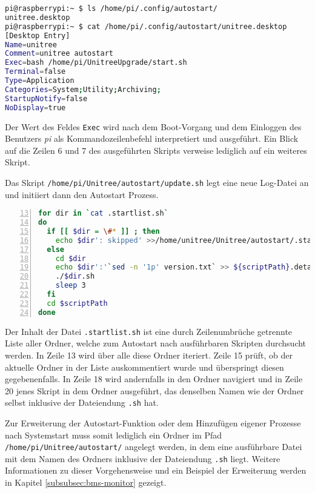 \begin{lstlisting}[language=sh]
pi@raspberrypi:~ $ ls /home/pi/.config/autostart/
unitree.desktop
pi@raspberrypi:~ $ cat /home/pi/.config/autostart/unitree.desktop
[Desktop Entry]
Name=unitree
Comment=unitree autostart
Exec=bash /home/pi/UnitreeUpgrade/start.sh
Terminal=false
Type=Application
Categories=System;Utility;Archiving;
StartupNotify=false
NoDisplay=true
\end{lstlisting}

\noindent Der Wert des Feldes \texttt{Exec} wird nach dem Boot-Vorgang und dem Einloggen des Benutzers \emph{pi} als
Kommandozeilenbefehl interpretiert und ausgeführt.
Ein Blick auf die Zeilen \num{6} und \num{7} des ausgeführten Skripts verweise lediglich auf ein weiteres Skript.



\noindent Das Skript \texttt{/home/\allowbreak pi/\allowbreak Unitree/\allowbreak autostart/\allowbreak update.sh}
legt eine neue Log-Datei an und initiiert dann den Autostart Prozess.

\begin{lstlisting}[language=Bash,numbers=left,xleftmargin=2.5em,framexleftmargin=2em,firstnumber=13]
for dir in `cat .startlist.sh`
do
  if [[ $dir = \#* ]] ; then
    echo $dir': skipped' >>/home/unitree/Unitree/autostart/.startlog
  else
    cd $dir
    echo $dir':'`sed -n '1p' version.txt` >> ${scriptPath}.detailedVersion
    ./$dir.sh
    sleep 3
  fi
  cd $scriptPath
done
\end{lstlisting}

\noindent Der Inhalt der Datei \texttt{.startlist.sh} ist eine durch Zeilenumbrüche getrennte Liste aller Ordner, welche
zum Autostart nach ausführbaren Skripten durchsucht werden.
In Zeile \num{13} wird über alle diese Ordner iteriert.
Zeile \num{15} prüft, ob der aktuelle Ordner in der Liste auskommentiert wurde und überspringt diesen gegebenenfalls.
In Zeile \num{18} wird andernfalls in den Ordner navigiert und in Zeile \num{20} jenes Skript in dem Ordner ausgeführt,
das denselben Namen wie der Ordner selbst inklusive der Dateiendung \texttt{.sh} hat.

Zur Erweiterung der Autostart-Funktion oder dem Hinzufügen eigener Prozesse nach Systemstart muss somit lediglich ein
Ordner im Pfad \texttt{/home/\allowbreak pi/\allowbreak Unitree/\allowbreak autostart/} angelegt werden, in dem eine
ausführbare Datei mit dem Namen des Ordners inklusive der Dateiendung \texttt{.sh} liegt.
Weitere Informationen zu dieser Vorgehensweise und ein Beispiel der Erweiterung werden in Kapitel \ref{subsubsec:bms-monitor}
gezeigt.
